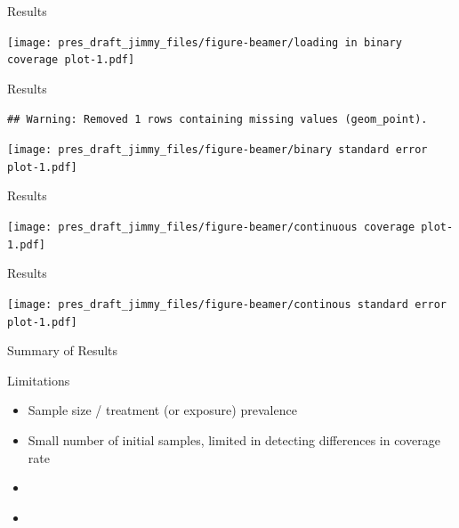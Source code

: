 \documentclass[
  ignorenonframetext,
]{beamer}
\providecommand{\tightlist}{%
  \setlength{\itemsep}{0pt}\setlength{\parskip}{0pt}}
\begin{document}
\begin{frame}{Results}
\protect\hypertarget{results}{}

\texttt{[image: pres\_draft\_jimmy\_files/figure-beamer/loading in binary coverage plot-1.pdf]}

\end{frame}

\begin{frame}[fragile]{Results}
\protect\hypertarget{results-1}{}

\begin{verbatim}
## Warning: Removed 1 rows containing missing values (geom_point).
\end{verbatim}

\texttt{[image: pres\_draft\_jimmy\_files/figure-beamer/binary standard error plot-1.pdf]}

\end{frame}

\begin{frame}{Results}
\protect\hypertarget{results-2}{}

\texttt{[image: pres\_draft\_jimmy\_files/figure-beamer/continuous coverage plot-1.pdf]}

\end{frame}

\begin{frame}{Results}
\protect\hypertarget{results-3}{}

\texttt{[image: pres\_draft\_jimmy\_files/figure-beamer/continous standard error plot-1.pdf]}

\end{frame}

\begin{frame}{Summary of Results}
\protect\hypertarget{summary-of-results}{}

\end{frame}

\begin{frame}{Limitations}
\protect\hypertarget{limitations}{}

\begin{itemize}[<+->]
\tightlist
\item
  Sample size / treatment (or exposure) prevalence
\end{itemize}

\begin{itemize}[<+->]
\tightlist
\item
  Small number of initial samples, limited in detecting differences in
  coverage rate
\end{itemize}

\begin{itemize}[<+->]
\item
\end{itemize}

\begin{itemize}[<+->]
\item
\end{itemize}

\end{frame}
\end{document}
